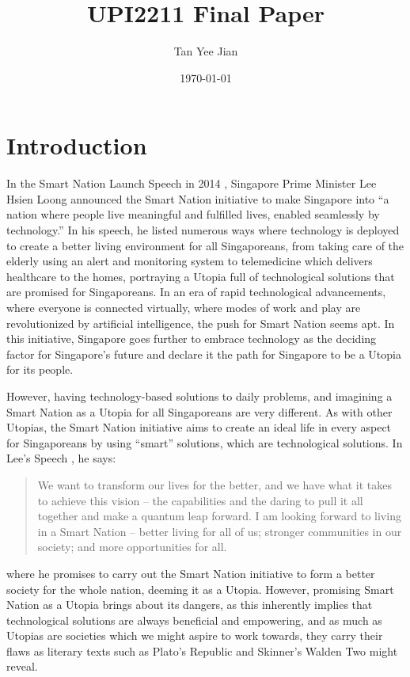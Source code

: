 \documentclass[11pt]{article}
\author{Tan Yee Jian}
\date{\today}
\title{UPI2211 Final Paper}
\begin{document}
\maketitle
\tableofcontents

\section{Introduction}
\label{sec:org15df530}
In the Smart Nation Launch Speech in 2014 \cite{lhl2014_smart_nation}, Singapore
Prime Minister Lee Hsien Loong announced the Smart Nation initiative to make
Singapore into ``a nation where people live meaningful and fulfilled lives,
enabled seamlessly by technology.'' In his speech, he listed numerous ways where
technology is deployed to create a better living environment for all
Singaporeans, from taking care of the elderly using an alert and monitoring
system to telemedicine which delivers healthcare to the homes, portraying a
Utopia full of technological solutions that are promised for Singaporeans. In an
era of rapid technological advancements, where everyone is connected virtually,
where modes of work and play are revolutionized by artificial intelligence, the
push for Smart Nation seems apt. In this initiative, Singapore goes further to
embrace technology as the deciding factor for Singapore's future and declare it
the path for Singapore to be a Utopia for its people.

However, having technology-based solutions to daily problems, and imagining a
Smart Nation as a Utopia for all Singaporeans are very different. As with other
Utopias, the Smart Nation initiative aims to create an ideal life in every
aspect for Singaporeans by using ``smart'' solutions, which are technological
solutions. In Lee's Speech \cite{lhl2014_smart_nation}, he says:

\begin{quote}
We want to transform our lives for the better, and we have what it takes to
achieve this vision – the capabilities and the daring to pull it all together
and make a quantum leap forward. I am looking forward to living in a Smart
Nation – better living for all of us; stronger communities in our society; and
more opportunities for all.
\end{quote}

where he promises to carry out the Smart Nation initiative to form a better
society for the whole nation, deeming it as a Utopia. However, promising Smart
Nation as a Utopia brings about its dangers, as this inherently implies that
technological solutions are always beneficial and empowering, and as much as
Utopias are societies which we might aspire to work towards, they carry their
flaws as literary texts such as Plato's Republic and Skinner's Walden Two
might reveal.
\end{document}
